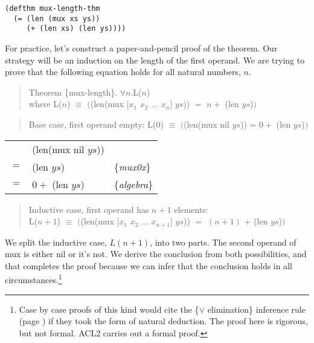 \label{mux-length-thm}
\begin{Verbatim}
(defthm mux-length-thm
  (= (len (mux xs ys))
     (+ (len xs) (len ys))))
\end{Verbatim}

For practice, let's construct a paper-and-pencil proof of the theorem.
Our strategy will be an induction on the length of the first operand.
We are trying to prove that the following equation holds for all natural numbers, $n$.
\begin{quote}
Theorem \{mux-length\}. $\forall n.$L($n$)\\
where L($n$) $\equiv$ $($\textsf{(len(mux [$x_1$ $x_2$ $\dots$ $x_n$] $ys$)) $=$ $n +$ (len $ys$)}$)$
\end{quote}

\begin{quote}
Base case, first operand empty: L($0$) $\equiv$ $($\textsf{(len(mux nil $ys$)) = $0 +$ (len $ys$)}$)$
\end{quote}
\begin{center}
\begin{tabular}{lll}
     & \textsf{(len(mux nil $ys$)})    &                   \\
 $=$ & \textsf{(len $ys$)}             & \{\emph{mux0x}\}  \\
 $=$ & \textsf{$0 +$ (len $ys$)}       & \{\emph{algebra}\}\\
\end{tabular}
\end{center}

\begin{quote}
\label{mux-length-thm-induc-case}
Inductive case, first operand has $n+1$ elements:\\
L($n+1$) $\equiv$ $($\textsf{(len(mux [$x_1$ $x_2$ $\dots$ $x_{n+1}$] $ys$)) $=$ $(n+1)$ + (len $ys$)}$)$
\end{quote}

We split the inductive case, $L(n+1)$, into two parts.
The second operand of \textsf{mux} is either \textsf{nil} or it's not.
We derive the conclusion from both possibilities,
and that completes the proof because we can infer
that the conclusion holds in all
circumstances.\footnote{Case by case proofs of this kind
would cite the \{$\vee$ elimination\} inference rule
(page \pageref{fig-02-deduction-rules}) if they
took the form of natural deduction.
The proof here is rigorous, but not formal.
ACL2 carries out a formal proof.}

